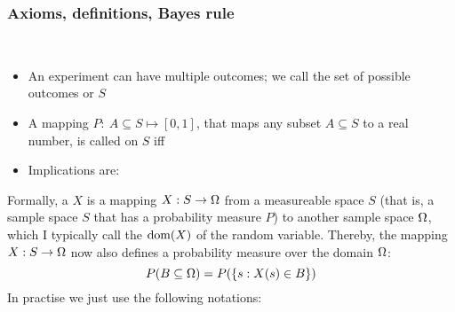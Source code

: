 \subsubsection{Axioms, definitions, Bayes rule}

\begin{myDefinition} ~\\[-5ex]
\begin{itemize}
\item An experiment can have multiple outcomes; we call the set of
possible outcomes  or  $S$
\item A mapping $P:~ A\subseteq S \mapsto [0,1]$, that maps any subset
$A\subseteq S$ to a real number, is called 
on $S$ iff
\item Implications are:
\end{itemize}
\end{myDefinition}

Formally, a  $X$ is a mapping $X:S\to \Omega$ from a 
measureable space $S$ (that is, a sample space $S$ that has a
probability measure $P$) to another sample space $\Omega$, which I
typically call the  ${\rm dom}(X)$ of the random
variable. Thereby, the mapping $X: S \to \Omega$ now also defines a probability
measure over the domain $\Omega$:
\begin{equation}
P(B \subseteq \Omega) = P(\{ s : X(s)\in B \})
\end{equation}
In practise we just use the following notations:


